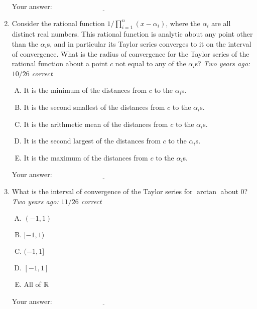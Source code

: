 \documentclass[10pt]{amsart}
\begin{document}
\begin{enumerate}
  \vspace{0.05in}
  Your answer: $\underline{\qquad\qquad\qquad\qquad\qquad\qquad\qquad}$
  \vspace{0.05in}

\item Consider the rational function $1/\prod_{i=1}^n (x - \alpha_i)$,
  where the $\alpha_i$ are all distinct real numbers. This rational
  function is analytic about any point other than the $\alpha_i$s, and
  in particular its Taylor series converges to it on the interval of
  convergence. What is the radius of convergence for the Taylor series
  of the rational function about a point $c$ not equal to any of the
  $\alpha_i$s? {\em Two years ago: $10/26$ correct}

  \begin{enumerate}[(A)]
  \item It is the minimum of the distances from $c$ to the $\alpha_i$s.
  \item It is the second smallest of the distances from $c$ to the
    $\alpha_i$s.
  \item It is the arithmetic mean of the distances from $c$ to the $\alpha_i$s.
  \item It is the second largest of the distances from $c$ to the
    $\alpha_i$s.
  \item It is the maximum of the distances from $c$ to the $\alpha_i$s.
  \end{enumerate}

  \vspace{0.05in}
  Your answer: $\underline{\qquad\qquad\qquad\qquad\qquad\qquad\qquad}$
  \vspace{0.05in}

\item What is the interval of convergence of the Taylor series for
  $\arctan$ about $0$? {\em Two years ago: $11/26$ correct}
  
  \begin{enumerate}[(A)]
  \item $(-1,1)$
  \item $[-1,1)$
  \item $(-1,1]$
  \item $[-1,1]$
  \item All of $\mathbb{R}$
  \end{enumerate}

  \vspace{0.05in}
  Your answer: $\underline{\qquad\qquad\qquad\qquad\qquad\qquad\qquad}$
  \vspace{0.05in}


\end{enumerate}
\end{document}
